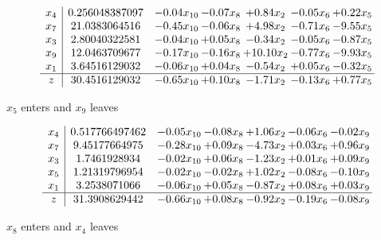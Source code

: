 \documentclass[9pt]{article}
\begin{document}
 \[\begin{array}{c| c c@{\hskip 2pt} c@{\hskip 2pt} c@{\hskip 2pt} c@{\hskip 2pt} c@{\hskip 2pt} }
 x_{4}   &  0.256048387097 & -0.04 x_{10} & -0.07 x_{8} & +  0.84 x_{2} & -0.05 x_{6} & +  0.22 x_{5}\\
 x_{7}   &  21.0383064516 & -0.45 x_{10} & -0.06 x_{8} & +  4.98 x_{2} & -0.71 x_{6} & -9.55 x_{5}\\
 x_{3}   &  2.80040322581 & -0.04 x_{10} & +  0.05 x_{8} & -0.34 x_{2} & -0.05 x_{6} & -0.87 x_{5}\\
 x_{9}   &  12.0463709677 & -0.17 x_{10} & -0.16 x_{8} & + 10.10 x_{2} & -0.77 x_{6} & -9.93 x_{5}\\
 x_{1}   &  3.64516129032 & -0.06 x_{10} & +  0.04 x_{8} & -0.54 x_{2} & +  0.05 x_{6} & -0.32 x_{5}\\
\hline
z    &  30.4516129032 & -0.65 x_{10} & +  0.10 x_{8} & -1.71 x_{2} & -0.13 x_{6} & +  0.77 x_{5}\\
\end{array}\]


 $ x_{5} $ enters and $ x_{9} $ leaves 

 \[\begin{array}{c| c c@{\hskip 2pt} c@{\hskip 2pt} c@{\hskip 2pt} c@{\hskip 2pt} c@{\hskip 2pt} }
 x_{4}   &  0.517766497462 & -0.05 x_{10} & -0.08 x_{8} & +  1.06 x_{2} & -0.06 x_{6} & -0.02 x_{9}\\
 x_{7}   &  9.45177664975 & -0.28 x_{10} & +  0.09 x_{8} & -4.73 x_{2} & +  0.03 x_{6} & +  0.96 x_{9}\\
 x_{3}   &  1.7461928934 & -0.02 x_{10} & +  0.06 x_{8} & -1.23 x_{2} & +  0.01 x_{6} & +  0.09 x_{9}\\
 x_{5}   &  1.21319796954 & -0.02 x_{10} & -0.02 x_{8} & +  1.02 x_{2} & -0.08 x_{6} & -0.10 x_{9}\\
 x_{1}   &  3.2538071066 & -0.06 x_{10} & +  0.05 x_{8} & -0.87 x_{2} & +  0.08 x_{6} & +  0.03 x_{9}\\
\hline
z    &  31.3908629442 & -0.66 x_{10} & +  0.08 x_{8} & -0.92 x_{2} & -0.19 x_{6} & -0.08 x_{9}\\
\end{array}\]


 $ x_{8} $ enters and $ x_{4} $ leaves 
\end{document}
